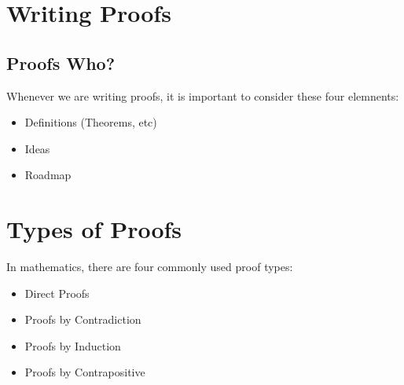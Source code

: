 \documentclass{report}
\begin{document}
\begin{sloppypar}
\begin{center}
{{\begin{enumerate}
      \end{enumerate}

    }
  }
\end{center}

\section{Writing Proofs}
\subsection{Proofs Who?}
Whenever we are writing proofs, it is important to consider
these four elemnents:
\begin{itemize}
  \item Definitions (Theorems, etc)
  \item Ideas
  \item Roadmap

\end{itemize}

\section{Types of Proofs}
In mathematics, there are four commonly used proof
types:
\begin{itemize}
  \item Direct Proofs
  \item Proofs by Contradiction
  \item Proofs by Induction
  \item Proofs by Contrapositive

\end{itemize}

\begin{center}
\end{center}

\begin{center}
\end{center}

\begin{center}
\end{center}


\end{sloppypar}
\end{document}
